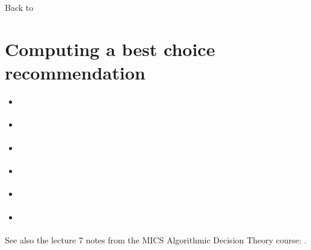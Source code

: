 \documentclass[a4paper,12pt,english]{sphinxhowto}
\begin{document}
Back to {\hyperref[\detokenize{tutorial:tutorial-label}]{}}


\section{Computing a best choice recommendation}
\label{\detokenize{tutorial:computing-a-best-choice-recommendation}}\label{\detokenize{tutorial:rubis-tutorial-label}}
\begin{sphinxShadowBox}
\begin{itemize}
\item {} 
\label{\detokenize{tutorial:id205}}{\hyperref[\detokenize{tutorial:what-site-to-choose}]{}}

\item {} 
\label{\detokenize{tutorial:id206}}{\hyperref[\detokenize{tutorial:performance-tableau}]{}}

\item {} 
\label{\detokenize{tutorial:id207}}{\hyperref[\detokenize{tutorial:id48}]{}}

\item {} 
\label{\detokenize{tutorial:id208}}{\hyperref[\detokenize{tutorial:rubis-best-choice-recommendations}]{}}

\item {} 
\label{\detokenize{tutorial:id209}}{\hyperref[\detokenize{tutorial:computing-strict-best-choice-recommendations}]{}}

\item {} 
\label{\detokenize{tutorial:id210}}{\hyperref[\detokenize{tutorial:weakly-ordering-the-outranking-digraph}]{}}

\end{itemize}
\end{sphinxShadowBox}

See also the lecture 7 notes from the MICS Algorithmic Decision Theory course: .
\end{document}
